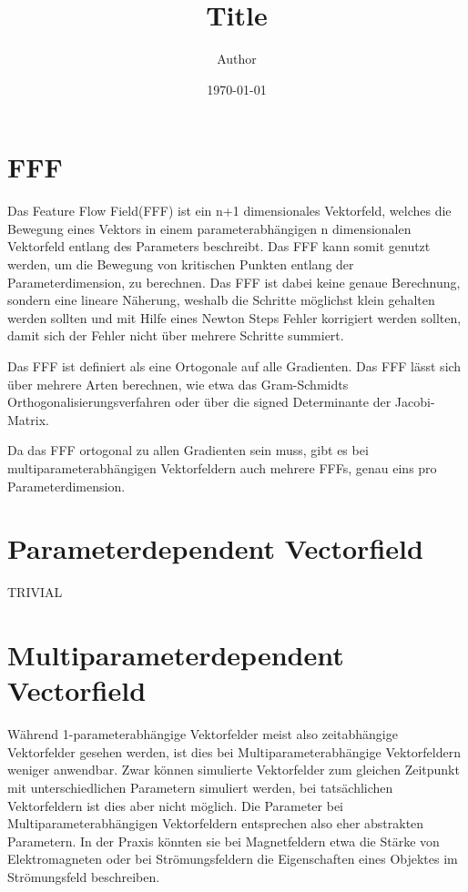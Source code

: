 \documentclass[11pt]{article}
\title{ Title}
\author{ Author }
\date{\today}
\begin{document}
\maketitle	
\pagebreak

\section{FFF}
Das Feature Flow Field(FFF) ist ein n+1 dimensionales Vektorfeld, welches die Bewegung eines Vektors in einem parameterabhängigen n dimensionalen Vektorfeld entlang des Parameters beschreibt.
Das FFF kann somit genutzt werden, um die Bewegung von kritischen Punkten entlang der Parameterdimension, zu berechnen.
Das FFF ist dabei keine genaue Berechnung, sondern eine lineare Näherung, weshalb die Schritte möglichst klein gehalten werden sollten und mit Hilfe eines Newton Steps Fehler korrigiert werden sollten, damit sich der Fehler nicht über mehrere Schritte summiert.

Das FFF ist definiert als eine Ortogonale auf alle Gradienten.
Das FFF lässt sich über mehrere Arten berechnen, wie etwa das Gram-Schmidts Orthogonalisierungsverfahren oder über die signed Determinante der Jacobi-Matrix.

Da das FFF ortogonal zu allen Gradienten sein muss, gibt es bei multiparameterabhängigen Vektorfeldern auch mehrere FFFs, genau eins pro Parameterdimension.


\section{Parameterdependent Vectorfield}
TRIVIAL

\section{Multiparameterdependent Vectorfield}
Während 1-parameterabhängige Vektorfelder meist also zeitabhängige Vektorfelder gesehen werden, ist dies bei Multiparameterabhängige Vektorfeldern weniger anwendbar. Zwar können simulierte Vektorfelder zum gleichen Zeitpunkt mit unterschiedlichen Parametern simuliert werden, bei tatsächlichen Vektorfeldern ist dies aber nicht möglich. Die Parameter bei Multiparameterabhängigen Vektorfeldern entsprechen also eher abstrakten Parametern. In der Praxis könnten sie bei Magnetfeldern etwa die Stärke von Elektromagneten oder bei Strömungsfeldern die Eigenschaften eines Objektes im Strömungsfeld beschreiben.
\end{document}

